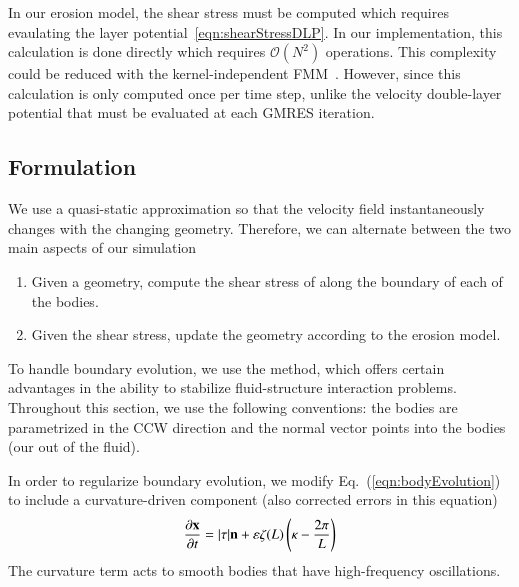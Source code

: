 \documentclass[preprint, 10pt]{elsarticle}
\begin{document}
In our erosion model, the shear stress must be computed which requires
evaulating the layer potential~\eqref{eqn:shearStressDLP}.  In our
implementation, this calculation is done directly which requires
$\mathcal{O}(N^2)$ operations.  This complexity could be reduced with
the kernel-independent FMM~\cite{yin-bir-zor2004}.  However, since this
calculation is only computed once per time step, unlike the velocity
double-layer potential that must be evaluated at each GMRES iteration.  

\subsection{\thL Formulation} 
\label{sec:thetaL}

We use a quasi-static approximation so that the velocity field
instantaneously changes with the changing geometry.  Therefore, we can
alternate between the two main aspects of our simulation
\begin{enumerate}
  \item Given a geometry, compute the shear stress of along the boundary
    of each of the bodies.
  \item Given the shear stress, update the geometry according to the
    erosion model.
\end{enumerate}

To handle boundary evolution, we use the \thL    method, which offers certain advantages in the ability to stabilize fluid-structure interaction problems. Throughout this section, we use the following conventions: the bodies are parametrized in the CCW direction and the normal vector points into the bodies (our out of the fluid).



In order to regularize boundary evolution, we modify
Eq.~(\ref{eqn:bodyEvolution}) to include a curvature-driven component
(also corrected errors in this equation)
\begin{equation}
\frac{\partial {\mathbf{x}}}{\partial t} = |\tau| {\mathbf{n}} + \varepsilon \zeta(L) \left(\kappa - \frac{2 \pi}{L} \right)
\end{equation}
The curvature term acts to smooth bodies that have high-frequency oscillations.




\end{document}
